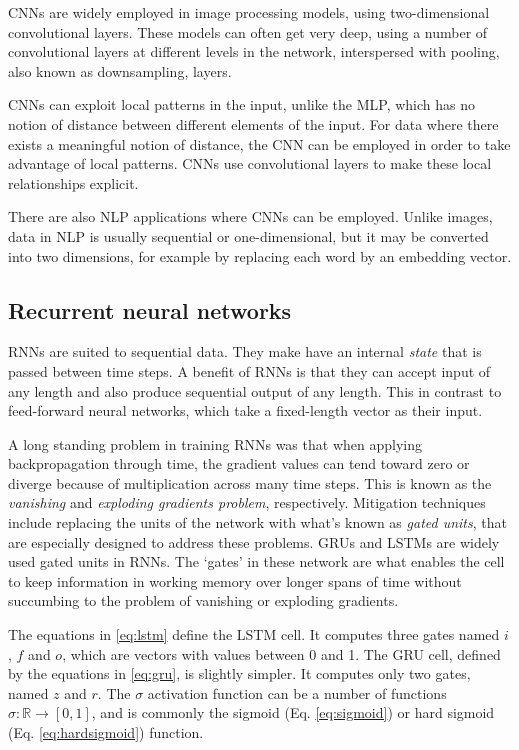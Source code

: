 \acp{CNN} are widely employed in image processing models, using
two-dimensional convolutional layers. These models can often get very
deep, using a number of convolutional layers at different levels in the
network, interspersed with pooling, also known as downsampling, layers.

\acp{CNN} can exploit local patterns in the input, unlike the \ac{MLP}, which
has no notion of distance between different elements of the input. For data
where there exists a meaningful notion of distance, the \ac{CNN} can be
employed in order to take advantage of local patterns. \acp{CNN} use
convolutional layers to make these local relationships explicit.

There are also \ac{NLP} applications where \acp{CNN} can be employed. Unlike
images, data in \ac{NLP} is usually sequential or one-dimensional, but it may
be converted into two dimensions, for example by replacing each word by an
embedding vector.


\subsection{Recurrent neural networks}
\label{seq:rnn}

\acp{RNN} are suited to sequential data. They make have an internal
\emph{state} that is passed between time steps. A benefit of \acp{RNN} is
that they can accept input of any length and also produce sequential output
of any length. This in contrast to feed-forward neural networks, which take a
fixed-length vector as their input.

A long standing problem in training \acp{RNN} was that when applying
backpropagation through time, the gradient values can tend toward zero or
diverge because of multiplication across many time steps. This is known as
the \emph{vanishing} and \emph{exploding gradients problem}, respectively.
Mitigation techniques include replacing the units of the network with what's
known as \emph{gated units}, that are especially designed to address these
problems. \acp{GRU} and \acp{LSTM} are widely used gated units in RNNs. The
`gates' in these network are what enables the cell to keep information in
working memory over longer spans of time without succumbing to the problem of
vanishing or exploding gradients.

The equations in \ref{eq:lstm} define the LSTM cell. It computes three gates
named $i$, $f$ and $o$, which are vectors with values between 0 and 1. The
GRU cell, defined by the equations in \ref{eq:gru}, is slightly simpler. It
computes only two gates, named $z$ and $r$. The $\sigma$ activation function
can be a number of functions $\sigma : \mathbb{R} \rightarrow [0, 1]$, and is
commonly the sigmoid (Eq. \ref{eq:sigmoid}) or hard sigmoid (Eq.
\ref{eq:hardsigmoid}) function.

